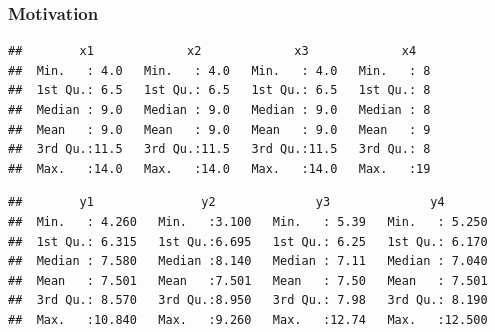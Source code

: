 \documentclass[12pt]{beamer}\usepackage[]{graphicx}\usepackage[]{color}
\makeatletter
\newenvironment{kframe}{%
 \def\at@end@of@kframe{}%
 \ifinner\ifhmode%
  \def\at@end@of@kframe{\end{minipage}}%
  \begin{minipage}{\columnwidth}%
 \fi\fi%
 \def\FrameCommand##1{\hskip\@totalleftmargin \hskip-\fboxsep
 \colorbox{shadecolor}{##1}\hskip-\fboxsep
     \hskip-\linewidth \hskip-\@totalleftmargin \hskip\columnwidth}%
 \MakeFramed {\advance\hsize-\width
   \@totalleftmargin\z@ \linewidth\hsize
   \@setminipage}}%
 {\par\unskip\endMakeFramed%
 \at@end@of@kframe}
\newenvironment{knitrout}{}{} %
\makeatother
\begin{document}

\begin{frame}[fragile]
\frametitle{Motivation}

\begin{knitrout}\scriptsize
{}\color{fgcolor}\begin{kframe}
\begin{verbatim}
##        x1             x2             x3             x4    
##  Min.   : 4.0   Min.   : 4.0   Min.   : 4.0   Min.   : 8  
##  1st Qu.: 6.5   1st Qu.: 6.5   1st Qu.: 6.5   1st Qu.: 8  
##  Median : 9.0   Median : 9.0   Median : 9.0   Median : 8  
##  Mean   : 9.0   Mean   : 9.0   Mean   : 9.0   Mean   : 9  
##  3rd Qu.:11.5   3rd Qu.:11.5   3rd Qu.:11.5   3rd Qu.: 8  
##  Max.   :14.0   Max.   :14.0   Max.   :14.0   Max.   :19
\end{verbatim}
\end{kframe}
\end{knitrout}

\begin{knitrout}\scriptsize
{}\color{fgcolor}\begin{kframe}
\begin{verbatim}
##        y1               y2              y3              y4        
##  Min.   : 4.260   Min.   :3.100   Min.   : 5.39   Min.   : 5.250  
##  1st Qu.: 6.315   1st Qu.:6.695   1st Qu.: 6.25   1st Qu.: 6.170  
##  Median : 7.580   Median :8.140   Median : 7.11   Median : 7.040  
##  Mean   : 7.501   Mean   :7.501   Mean   : 7.50   Mean   : 7.501  
##  3rd Qu.: 8.570   3rd Qu.:8.950   3rd Qu.: 7.98   3rd Qu.: 8.190  
##  Max.   :10.840   Max.   :9.260   Max.   :12.74   Max.   :12.500
\end{verbatim}
\end{kframe}
\end{knitrout}

\end{frame}


\begin{frame}
\begin{center}
\large{}
\end{center}
\end{frame}
\end{document}
